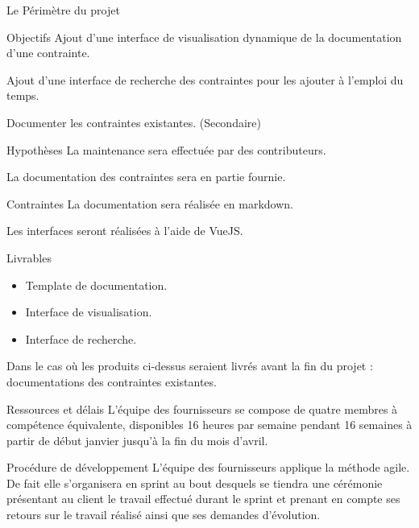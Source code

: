 \documentclass[]{article}
\begin{document}
    \begin{section}{Le Périmètre du projet}
        \begin{subsection}{Objectifs}
            Ajout d’une interface de visualisation dynamique de la documentation d’une contrainte.

            Ajout d’une interface de recherche des contraintes pour les ajouter à l’emploi du temps.

            Documenter les contraintes existantes. (Secondaire)
        \end{subsection}

        \begin{subsection}{Hypothèses}
            La maintenance sera effectuée par des contributeurs.

            La documentation des contraintes sera en partie fournie.
        \end{subsection}

        \begin{subsection}{Contraintes}
            La documentation sera réalisée en markdown.

            Les interfaces seront réalisées à l’aide de VueJS.
        \end{subsection}

        \begin{subsection}{Livrables}
            \begin{itemize}
                \item Template de documentation.
                \item Interface de visualisation.
                \item Interface de recherche.
            \end{itemize}

            Dans le cas où les produits ci-dessus seraient livrés avant la fin du projet : 
            documentations des contraintes existantes.
        \end{subsection}

        \begin{subsection}{Ressources et délais}
            L’équipe des fournisseurs se compose de quatre membres à compétence équivalente, disponibles 16 heures par semaine 
            pendant 16 semaines à partir de début janvier jusqu'à la fin du mois d'avril.           
        \end{subsection}

        \begin{subsection}{Procédure de développement}
            L’équipe des fournisseurs applique la méthode agile. De fait elle s’organisera en sprint au bout desquels se tiendra 
            une cérémonie présentant au client le travail effectué durant le sprint et prenant en compte ses retours sur le 
            travail réalisé ainsi que ses demandes d’évolution.


\end{subsection}
\end{section}
\end{document}
